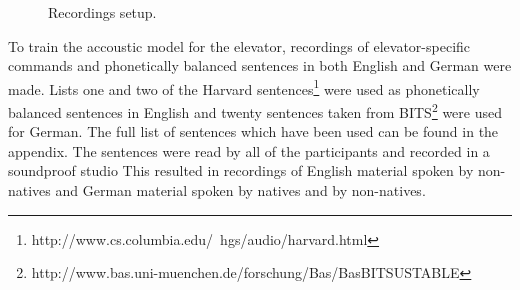 \documentclass[a4paper, 12pt]{article}
\begin{document}
\begin{figure}
\caption{Recordings setup.}
\label{fig:recordingsetup}
\end{figure}


To train the accoustic model for the elevator, recordings of elevator-specific commands and phonetically balanced sentences in both English and German were made. 
Lists one and two  of the Harvard sentences\footnote{http://www.cs.columbia.edu/~hgs/audio/harvard.html} were used as phonetically balanced sentences in English and twenty sentences taken from BITS\footnote{http://www.bas.uni-muenchen.de/forschung/Bas/BasBITSUSTABLE} were used for German. 
The full list of sentences which have been used can be found in the appendix. %
The sentences were read by all of the participants and recorded in a soundproof studio
This resulted in recordings of English material spoken by non-natives and German material spoken by natives and by non-natives.
\end{document}
